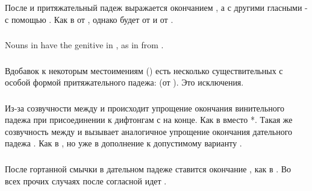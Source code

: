 \label{morph:decl:pseudovowel}

\subsubsection{} После  и  притяжательный падеж выражается окончанием
, а с другими гласными - с помощью .  Как в 
от , однако будет  от  и 
от .

\subsubsection{} Nouns in  have the genitive in , as in
 from .

\subsubsection{} Вдобавок к некоторым местоимениям
() есть несколько существительных с особой формой притяжательного падежа:  (от ).  Это исключения.

\subsubsection{} Из-за созвучности между  и
 происходит упрощение окончания винительного падежа  при присоединении к дифтонгам с  на конце. Как в   вместо *. Такая же созвучность между  и
 вызывает аналогичное упрощение окончания дательного падежа . Как в  , но уже в дополнение к допустимому варианту .

\subsubsection{} После гортанной смычки в дательном падеже ставится окончание , как в .  Во всех прочих случаях после согласной идет .

